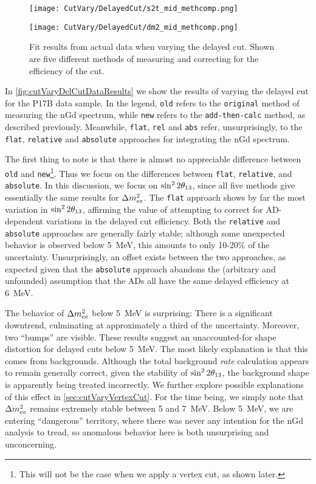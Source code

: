 \documentclass[../thesis.tex]{subfiles}
\begin{document}
\begin{figure}[ht]
  \begin{minipage}{0.5\linewidth}%
    \texttt{[image: CutVary/DelayedCut/s2t\_mid\_methcomp.png]}%
  \end{minipage}%
  \begin{minipage}{0.5\linewidth}%
    \texttt{[image: CutVary/DelayedCut/dm2\_mid\_methcomp.png]}%
  \end{minipage}%
  \caption{Fit results from actual data when varying the delayed cut. Shown are five different methods of measuring and correcting for the efficiency of the cut.}
  \label{fig:cutVaryDelCutDataResults}
\end{figure}

In \autoref{fig:cutVaryDelCutDataResults} we show the results of varying the delayed cut for the P17B data sample. In the legend, \texttt{old} refers to the \texttt{original} method of measuring the nGd spectrum, while \texttt{new} refers to the \texttt{add-then-calc} method, as described previously. Meanwhile, \texttt{flat}, \texttt{rel} and \texttt{abs} refer, unsurprisingly, to the \texttt{flat}, \texttt{relative} and \texttt{absolute} approaches for integrating the nGd spectrum.

The first thing to note is that there is almost no appreciable difference between \texttt{old} and \texttt{new}\footnote{This will not be the case when we apply a vertex cut, as shown later.}. Thus we focus on the differences between \texttt{flat}, \texttt{relative}, and \texttt{absolute}. In this discussion, we focus on $\sin^2 2\theta_{13}$, since all five methods give essentially the same results for $\Delta m^2_{ee}$. The \texttt{flat} approach shows by far the most variation in $\sin^2 2\theta_{13}$, affirming the value of attempting to correct for AD-dependent variations in the delayed cut efficiency. Both the \texttt{relative} and \texttt{absolute} approaches are generally fairly stable; although some unexpected behavior is observed below 5~MeV, this amounts to only 10-20\% of the uncertainty. Unsurprisingly, an offset exists between the two approaches, as expected given that the \texttt{absolute} approach abandons the (arbitrary and unfounded) assumption that the ADs all have the same delayed efficiency at 6~MeV.

The behavior of $\Delta m^2_{ee}$ below 5~MeV is surprising: There is a significant downtrend, culminating at approximately a third of the uncertainty. Moreover, two ``bumps'' are visible. These results suggest an unaccounted-for shape distortion for delayed cuts below 5~MeV. The most likely explanation is that this comes from backgrounds. Although the total background \emph{rate} calculation appears to remain generally correct, given the stability of $\sin^2 2\theta_{13}$, the background shape is apparently being treated incorrectly. We further explore possible explanations of this effect in \autoref{sec:cutVaryVertexCut}. For the time being, we simply note that $\Delta m^2_{ee}$ remains extremely stable between 5 and 7~MeV. Below 5~MeV, we are entering ``dangerous'' territory, where there was never any intention for the nGd analysis to tread, so anomalous behavior here is both unsurprising and unconcerning.
\end{document}
